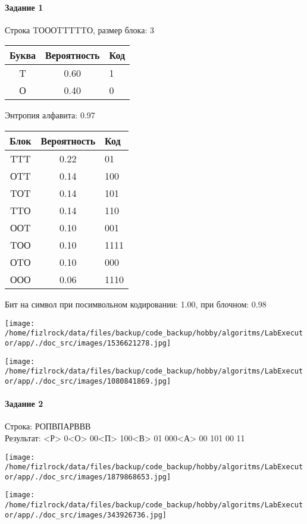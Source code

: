 \documentclass[a4paper, 12pt]{article}
\begin{document}
\paragraph{Задание 1}

Строка TОООTTTTTО, размер блока: 3
\begin{center}
 \begin{tabular}{ |c|c|l| } 
  \hline
     Буква & Вероятность & Код\\ \hline
T & 0.60 & 1\\\hline
О & 0.40 & 0
\\ \hline \end{tabular}
\end{center}
Энтропия алфавита: 0.97
\begin{center}
 \begin{tabular}{ |c|c|l| } 
  \hline
     Блок & Вероятность & Код\\ \hline
TTT & 0.22 & 01\\\hline
ОTT & 0.14 & 100\\\hline
TОT & 0.14 & 101\\\hline
TTО & 0.14 & 110\\\hline
ООT & 0.10 & 001\\\hline
TОО & 0.10 & 1111\\\hline
ОTО & 0.10 & 000\\\hline
ООО & 0.06 & 1110
\\ \hline \end{tabular}
\end{center}
Бит на символ при посимвольном кодировании: 1.00, при блочном: 0.98

\texttt{[image: /home/fizlrock/data/files/backup/code\_backup/hobby/algoritms/LabExecutor/app/./doc\_src/images/1536621278.jpg]}

\texttt{[image: /home/fizlrock/data/files/backup/code\_backup/hobby/algoritms/LabExecutor/app/./doc\_src/images/1080841869.jpg]}
\pagebreak
\paragraph{Задание 2}

Строка: 
РОПВПАРВВВ\\
Результат: <Р> 0<О> 00<П> 100<В> 01 000<А> 00 101 00 11

\texttt{[image: /home/fizlrock/data/files/backup/code\_backup/hobby/algoritms/LabExecutor/app/./doc\_src/images/1879868653.jpg]}

\texttt{[image: /home/fizlrock/data/files/backup/code\_backup/hobby/algoritms/LabExecutor/app/./doc\_src/images/343926736.jpg]}
\end{document}
